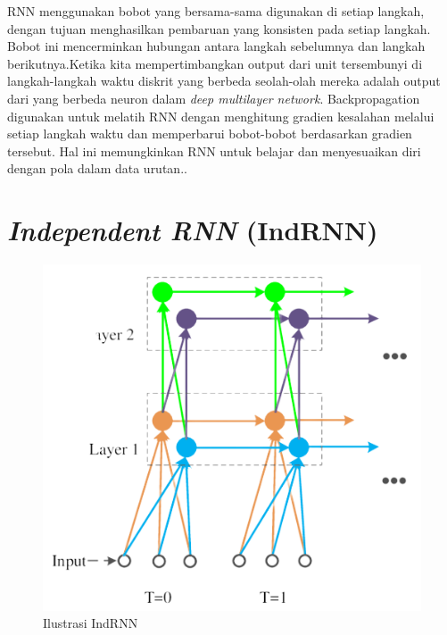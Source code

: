 RNN menggunakan bobot yang bersama-sama digunakan di setiap langkah, dengan tujuan menghasilkan pembaruan yang konsisten
pada setiap langkah. Bobot ini mencerminkan hubungan antara langkah sebelumnya dan langkah berikutnya.Ketika kita
mempertimbangkan output dari unit tersembunyi di langkah-langkah waktu diskrit yang berbeda seolah-olah mereka adalah output
dari yang berbeda neuron dalam \emph{deep multilayer network}. Backpropagation digunakan untuk melatih RNN dengan menghitung gradien
kesalahan melalui setiap langkah waktu dan memperbarui bobot-bobot berdasarkan gradien tersebut. Hal ini memungkinkan RNN untuk
belajar dan menyesuaikan diri dengan pola dalam data urutan.\parencite{18}.

\section{\emph{Independent RNN} (IndRNN)}

\begin{figure} [ht] \centering
  \includegraphics[scale=0.45]{gambar/indrnn.png}
  \caption{Ilustrasi IndRNN \parencite{8}}
  \label{fig:indrnn}
\end{figure}

